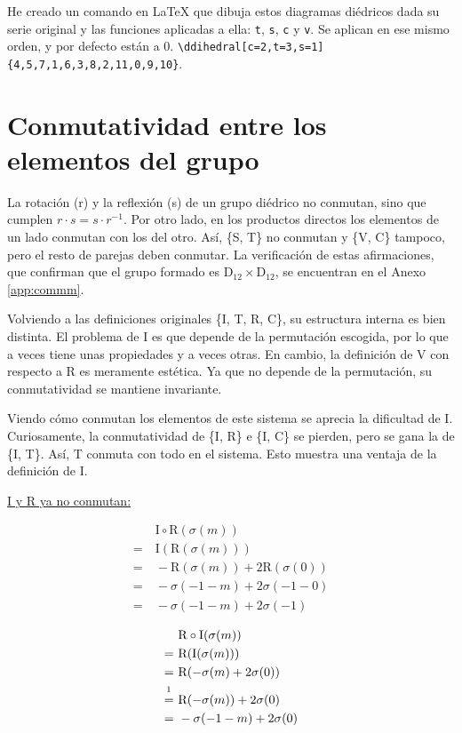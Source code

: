 	\pagebreak
	He creado un comando en \LaTeX{} que dibuja estos diagramas diédricos dada su serie original y las funciones aplicadas a ella: \verb|t|, \verb|s|, \verb|c| y \verb|v|. Se aplican en ese mismo orden, y por defecto están a 0. \linebreak \verb|\ddihedral[c=2,t=3,s=1]{4,5,7,1,6,3,8,2,11,0,9,10}|.
	
	\section{Conmutatividad entre los elementos del grupo}
	\label{conmut}
		
		La rotación (r) y la reflexión (s) de un grupo diédrico no conmutan, sino que cumplen $r\cdot s=s\cdot r^{-1}$. Por otro lado, en los productos directos los elementos de un lado conmutan con los del otro. Así, \{S, T\} no conmutan y \{V, C\} tampoco, pero el resto de parejas deben conmutar. La verificación de estas afirmaciones, que confirman que el grupo formado es D$_{12}\times\text{D}_{12}$, se encuentran en el Anexo \ref{app:commm}.
		
		Volviendo a las definiciones originales \{I, T, R, C\}, su estructura interna es bien distinta. El problema de I es que depende de la permutación escogida, por lo que a veces tiene unas propiedades y a veces otras. En cambio, la definición de V con respecto a R es meramente estética. Ya que no depende de la permutación, su conmutatividad se mantiene invariante. 
		
		Viendo cómo conmutan los elementos de este sistema se aprecia la dificultad de I. Curiosamente, la conmutatividad de \{I, R\} e \{I, C\} se pierden, pero se gana la de \{I, T\}. Así, T conmuta con todo en el sistema. Esto muestra una ventaja de la definición de I.
		
		 \underline{I y R ya no conmutan:}
		 \vspace{-2\bigskipamount}
		\begin{multicols}{2}
			\begin{align*}
		&\ \text{I}\circ\text{R}(\sigma(m))\\
		=&\ \text{I}(\text{R}(\sigma(m)))\\
		=&\ -\text{R}(\sigma(m))+2\text{R}(\sigma(0))\\
		=&\ -\sigma(-1-m)+2\sigma(-1-0)\\
		=&\ -\sigma(-1-m)+2\sigma(-1)
		\end{align*}
		
		\begin{align*}
		&\ \text{R}\circ\text{I}(\sigma(m))\\
		=&\ \text{R}(\text{I}(\sigma(m)))\\
		=&\ \text{R}(-\sigma(m)+2\sigma(0))\\
		\overset{\footnotemark}{=}&\ \text{R}(-\sigma(m))+2\sigma(0)\\
		=&\ -\sigma(-1-m)+2\sigma(0)
		\end{align*}
		\end{multicols}
		
